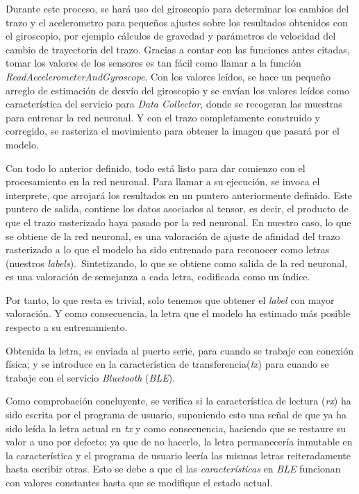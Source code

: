 Durante este proceso, se hará uso del giroscopio para determinar los cambios del trazo y el acelerometro
para pequeños ajustes sobre los resultados obtenidos con el giroscopio, por ejemplo
cálculos de gravedad y parámetros de velocidad del cambio de trayectoria del trazo.
Gracias a contar con las funciones antes citadas, tomar los valores de los sensores
es tan fácil como llamar a la función \textit{ReadAccelerometerAndGyroscope}.
Con los valores leídos, se hace un pequeño arreglo de estimación de desvío del giroscopio
y se envían los valores leídos como característica del servicio para \textit{Data Collector},
donde se recogeran las muestras para entrenar la red neuronal.
Y con el trazo completamente construido y corregido, se rasteriza el movimiento para
obtener la imagen que pasará por el modelo.

Con todo lo anterior definido, todo está listo para dar comienzo con el procesamiento
en la red neuronal. Para llamar a su ejecución,
se invoca el interprete, que arrojará los resultados en un puntero anteriormente definido.
Este puntero de salida, contiene los datos asociados al tensor, es decir, el producto
de que el trazo rasterizado haya pasado por la red neuronal. En nuestro caso, lo que
se obtiene de la red neuronal, es una valoración de ajuste de afinidad del trazo rasterizado
a lo que el modelo ha sido entrenado para reconocer como letras (nuestros \textit{labels}).\
Sintetizando, lo que se obtiene como salida de la red neuronal, es una valoración
de semejanza a cada letra, codificada como un índice.

Por tanto, lo que resta es trivial, solo tenemos que obtener el \textit{label} con mayor valoración.
Y como consecuencia, la letra que el modelo ha estimado más posible respecto a su entrenamiento.

Obtenida la letra, es enviada al puerto serie, para cuando se trabaje con conexión física;
y se introduce en la característica de transferencia(\textit{tx}) para cuando se trabaje
con el servicio \textit{Bluetooth} (\textit{BLE}).

Como comprobación concluyente, se verifica si la característica de lectura (\textit{rx}) ha sido
escrita por el programa de usuario, suponiendo esto una señal de que ya ha sido leída la letra
actual en \textit{tx} y como consecuencia, haciendo que se restaure su valor a uno por defecto;
ya que de no hacerlo, la letra permanecería inmutable en la característica y el programa
de usuario leería las mismas letras reiteradamente hasta escribir otras.
Esto se debe a que el las \textit{características} en \textit{BLE} funcionan con valores
constantes hasta que se modifique el estado actual.

